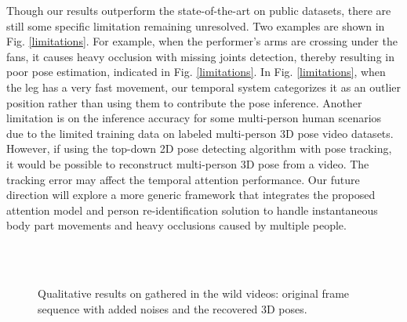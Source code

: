 \documentclass[twocolumn]{svjour3}          \smartqed  \usepackage{graphicx}
\begin{document}
Though our results outperform the state-of-the-art on public datasets, there are still some specific limitation remaining unresolved. Two examples are shown in Fig. \ref{limitations}. For example, when the performer's arms are crossing under the fans, it causes heavy occlusion with missing joints detection, thereby resulting in poor pose estimation, indicated in  Fig. \ref{limitations}. In Fig. \ref{limitations}, when the leg has a very fast movement, our temporal system categorizes it as an outlier position rather than using them to contribute the pose inference. Another limitation is on  the inference accuracy for some multi-person human scenarios due to the limited training data on labeled multi-person 3D pose video datasets. However, if using the top-down 2D pose detecting algorithm with pose tracking, it would be possible to reconstruct multi-person 3D pose from a video. The tracking error may affect the temporal attention performance. Our future direction will explore a more generic framework that integrates the proposed attention model and person re-identification solution to handle instantaneous body part movements and heavy occlusions caused by multiple people.

\begin{figure*}[]
\\
\\
\caption{Qualitative results on gathered in the wild videos: original frame sequence with added noises and the recovered 3D poses.}
\label{fig:wildvideonoise}
\end{figure*}

\begin{figure*}[t!]
\\
\\
\\
\\
\\
\end{figure*}
\end{document}
